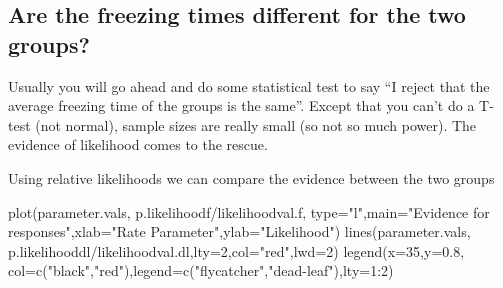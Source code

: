 \documentclass[
]{book}
\newenvironment{Shaded}{\begin{snugshade}}{\end{snugshade}}
\newcommand{\AttributeTok}[1]{\textcolor[rgb]{0.77,0.63,0.00}{#1}}
\newcommand{\DecValTok}[1]{\textcolor[rgb]{0.00,0.00,0.81}{#1}}
\newcommand{\FloatTok}[1]{\textcolor[rgb]{0.00,0.00,0.81}{#1}}
\newcommand{\FunctionTok}[1]{\textcolor[rgb]{0.00,0.00,0.00}{#1}}
\newcommand{\NormalTok}[1]{#1}
\newcommand{\SpecialCharTok}[1]{\textcolor[rgb]{0.00,0.00,0.00}{#1}}
\newcommand{\StringTok}[1]{\textcolor[rgb]{0.31,0.60,0.02}{#1}}
\begin{document}
\hypertarget{are-the-freezing-times-different-for-the-two-groups}{%
\subsection{Are the freezing times different for the two groups?}\label{are-the-freezing-times-different-for-the-two-groups}}

Usually you will go ahead and do some statistical test to say ``I reject that the average freezing time of the groups is the same''. Except that you can't do a T-test (not normal), sample sizes are really small (so not so much power). The evidence of likelihood comes to the rescue.

Using relative likelihoods we can compare the evidence between the two groups

\begin{Shaded}
\begin{Highlighting}[]
\FunctionTok{plot}\NormalTok{(parameter.vals, p.likelihoodf}\SpecialCharTok{/}\NormalTok{likelihoodval.f, }\AttributeTok{type=}\StringTok{"l"}\NormalTok{,}\AttributeTok{main=}\StringTok{"Evidence for responses"}\NormalTok{,}\AttributeTok{xlab=}\StringTok{"Rate Parameter"}\NormalTok{,}\AttributeTok{ylab=}\StringTok{"Likelihood"}\NormalTok{)}
\FunctionTok{lines}\NormalTok{(parameter.vals, p.likelihooddl}\SpecialCharTok{/}\NormalTok{likelihoodval.dl,}\AttributeTok{lty=}\DecValTok{2}\NormalTok{,}\AttributeTok{col=}\StringTok{"red"}\NormalTok{,}\AttributeTok{lwd=}\DecValTok{2}\NormalTok{)}
\FunctionTok{legend}\NormalTok{(}\AttributeTok{x=}\DecValTok{35}\NormalTok{,}\AttributeTok{y=}\FloatTok{0.8}\NormalTok{, }\AttributeTok{col=}\FunctionTok{c}\NormalTok{(}\StringTok{"black"}\NormalTok{,}\StringTok{"red"}\NormalTok{),}\AttributeTok{legend=}\FunctionTok{c}\NormalTok{(}\StringTok{"flycatcher"}\NormalTok{,}\StringTok{"dead{-}leaf"}\NormalTok{),}\AttributeTok{lty=}\DecValTok{1}\SpecialCharTok{:}\DecValTok{2}\NormalTok{)}
\end{Highlighting}
\end{Shaded}


  
\end{document}
